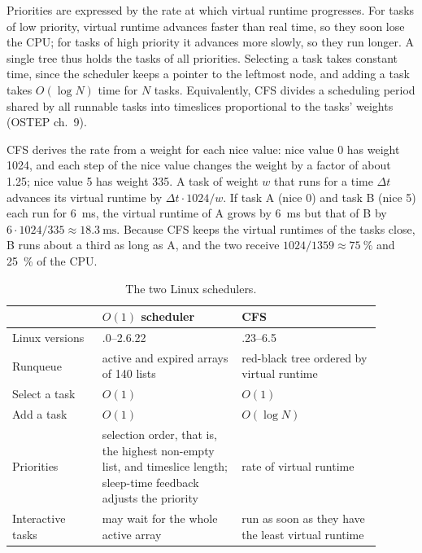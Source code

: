 \documentclass[../main.tex]{subfiles}
\begin{document}
Priorities are expressed by the rate at which virtual runtime progresses.
For tasks of low priority, virtual runtime advances faster than real time,
so they soon lose the CPU; for tasks of high priority it advances more
slowly, so they run longer.  A single tree thus holds the tasks of all
priorities.  Selecting a task takes constant time, since the scheduler keeps
a pointer to the leftmost node, and adding a task takes $O(\log N)$ time for
$N$ tasks.  Equivalently, CFS divides a scheduling period shared by all
runnable tasks into timeslices proportional to the tasks' weights (OSTEP
ch.~9).

\begin{example}
  CFS derives the rate from a weight for each nice value: nice value 0 has
  weight 1024, and each step of the nice value changes the weight by a
  factor of about 1.25; nice value 5 has weight 335.  A task of weight $w$
  that runs for a time $\Delta t$ advances its virtual runtime by
  $\Delta t \cdot 1024/w$.  If task A (nice 0) and task B (nice 5) each run
  for \SI{6}{\milli\second}, the virtual runtime of A grows by
  \SI{6}{\milli\second} but that of B by $6 \cdot 1024/335 \approx
  \SI{18.3}{\milli\second}$.  Because CFS keeps the virtual runtimes of the
  tasks close, B runs about a third as long as A, and the two receive
  $1024/1359 \approx \SI{75}{\percent}$ and \SI{25}{\percent} of the CPU.
\end{example}

\begin{table}[htbp]
  \centering
  \caption{The two Linux schedulers.}
  \label{tab:l07-linux}
  \small
  \begin{tabular}{@{}>{\raggedright\arraybackslash}p{0.22\linewidth}>{\raggedright\arraybackslash}p{0.34\linewidth}>{\raggedright\arraybackslash}p{0.34\linewidth}@{}}
    \toprule
    & $O(1)$ scheduler & CFS \\
    \midrule
    Linux versions & 2.6.0--2.6.22 & 2.6.23--6.5 \\
    Runqueue & active and expired arrays of 140 lists & red-black tree ordered
      by virtual runtime \\
    Select a task & $O(1)$ & $O(1)$ \\
    Add a task & $O(1)$ & $O(\log N)$ \\
    Priorities & selection order, that is, the highest non-empty list, and
      timeslice length; sleep-time feedback adjusts the priority & rate of
      virtual runtime \\
    Interactive tasks & may wait for the whole active array & run as soon
      as they have the least virtual runtime \\
    \bottomrule
  \end{tabular}
\end{table}
\end{document}
